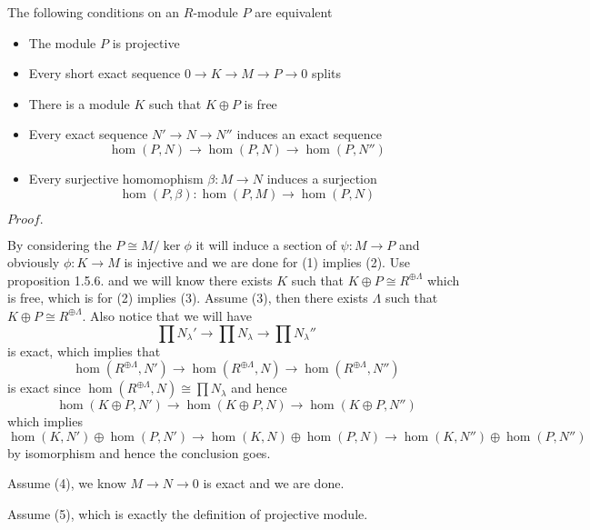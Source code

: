 \documentclass{article}
\newcommand{\Pf}[1]{$Proof.$\par}
\begin{document}
    \begin{theorem}
        The following conditions on an $R$-module $P$ are equivalent
        \begin{itemize}
            \item The module $P$ is projective
            \item Every short exact sequence $0\to K \to M \to P \to 0$ splits
            \item There is a module $K$ such that $K\oplus P$ is free
            \item Every exact sequence $N'\to N \to N''$ induces an exact sequence
            \[\hom(P,N) \to \hom(P,N) \to \hom(P,N'')\]
            \item Every surjective homomophism $\beta:M \to N$ induces a surjection
            \[\hom(P,\beta):\hom(P,M)\to \hom(P,N)\]
        \end{itemize}
    \end{theorem}
    \Pf\par
    By considering the $P\cong M/\ker \phi$ it will induce a section of $\psi:M\to P$ and obviously $\phi:K\to M$ is injective and we are done for (1) implies (2). Use proposition 1.5.6. and we will know there exists $K$ such that $K\oplus P \cong R^{\oplus \Lambda}$ which is free, which is for (2) implies (3). Assume (3), then there exists $\Lambda$ such that $K\oplus P \cong R^{\oplus \Lambda}$. Also notice that we will have
    \[\prod N_{\lambda}' \to \prod N_{\lambda} \to \prod N_{\lambda}''\]
    is exact, which implies that
    \[\hom(R^{\oplus \Lambda}, N') \to \hom(R^{\oplus \Lambda}, N) \to \hom(R^{\oplus \Lambda}, N'')\]
    is exact since $\hom(R^{\oplus \Lambda},N) \cong \prod N_{\lambda}$ and hence
    \[
    \hom(K\oplus P, N') \to \hom(K\oplus P, N) \to \hom(K\oplus P, N'')
    \]
    which implies
    \[
    \hom(K,N')\oplus\hom(P,N') \to \hom(K,N)\oplus\hom(P,N) \to \hom(K,N'')\oplus\hom(P,N'')
    \]
    by isomorphism and hence the conclusion goes.\par
    Assume (4), we know $M \to N \to 0$ is exact and we are done.\par
    Assume (5), which is exactly the definition of projective module.
\end{document}
